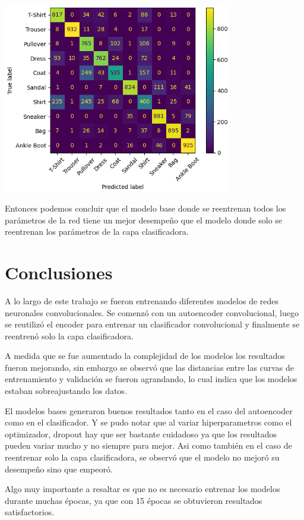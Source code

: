 \documentclass[aps,prl,reprint,groupedaddress]{revtex4-2}
\newenvironment{Figura}
  {\par\medskip\noindent\minipage{\linewidth}}
  {\endminipage\par\medskip}
\begin{document}
\begin{Figura}
  \centering
  \includegraphics[width=0.75\textwidth]{figs/matrix_confucion_modelo_original_entrenando_solo_clasificadora.png}
  \label{fig-matrix-a}
\end{Figura}

Entonces podemos concluir que el modelo base donde se reentrenan todos los
parámetros de la red tiene un mejor desempeño que el modelo donde solo se
reentrenan los parámetros de la capa clasificadora.

\section{Conclusiones}

A lo largo de este trabajo se fueron entrenando diferentes modelos de redes
neuronales convolucionales. Se comenzó con un autoencoder convolucional,
luego se reutilizó el encoder para entrenar un clasificador convolucional y
finalmente se reentrenó solo la capa clasificadora.

A medida que se fue aumentado la complejidad de los modelos los resultados
fueron mejorando, sin embargo se observó que las distancias entre las curvas
de entrenamiento y validación se fueron agrandando, lo cual indica que los
modelos estaban sobreajustando los datos.

El modelos bases generaron buenos resultados tanto en el caso del autoencoder 
como en el clasificador. Y se pudo notar que al variar hiperparametros como el
optimizador, dropout hay que ser bastante cuidadoso ya que los resultados 
pueden variar mucho y no siempre para mejor. Asi como también en el caso 
de reentrenar solo la capa clasificadora, se observó que el modelo no
mejoró su desempeño sino que empeoró.

Algo muy importante a resaltar es que no es necesario entrenar los modelos 
durante muchas épocas, ya que con 15 épocas se obtuvieron resultados 
satisfactorios.




\end{document}
